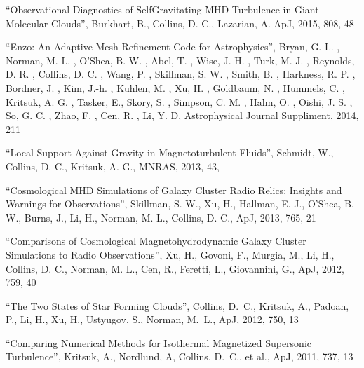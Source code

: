 \medskip
\noindent
``Observational Diagnostics of Self­Gravitating MHD Turbulence in Giant Molecular Clouds'', 
Burkhart, B., Collins, D.  C., Lazarian, A.
ApJ,  2015, 808, 48

\medskip
\noindent
``Enzo: An Adaptive Mesh Refinement Code for Astrophysics'', 
Bryan, G. L. , Norman, M. L. , O'Shea, B. W. , Abel, T. , Wise, J. H. , Turk, M. J. , Reynolds, D. R. , Collins, D. C. , Wang, P. , Skillman, S. W. , Smith, B. , Harkness, R. P. , Bordner, J. , Kim, J.-h. , Kuhlen, M. , Xu, H. , Goldbaum, N. , Hummels, C. , Kritsuk, A. G. , Tasker, E., Skory, S. , Simpson, C. M. , Hahn, O. , Oishi, J. S. , So, G. C. , Zhao, F. , Cen, R. , Li, Y. D,
Astrophysical Journal Suppliment, 2014, 211

\medskip
\noindent
``Local Support Against Gravity in Magnetoturbulent Fluids'',
Schmidt, W., Collins, D. C., Kritsuk, A. G.,
MNRAS, 2013, 43, 


\medskip
\noindent
``Cosmological MHD Simulations of Galaxy Cluster Radio Relics: Insights and Warnings for Observations'', 
Skillman, S. W., Xu, H., Hallman, E. J., O’Shea, B. W., Burns, J., Li, H., Norman, M. L., Collins, D. C.,
ApJ, 2013, 765, 21

\medskip
\noindent
``Comparisons of Cosmological Magnetohydrodynamic Galaxy Cluster Simulations to Radio Observations'', 
Xu, H., Govoni, F., Murgia, M., Li, H., Collins, D. C., Norman, M. L., Cen, R., Feretti, L., Giovannini, G.,
ApJ, 2012, 759, 40

\medskip
\noindent
``The Two States of Star Forming Clouds'', 
Collins, D.~C., Kritsuk, A., Padoan, P., Li, H., Xu, H., Ustyugov, S., Norman, M.~L.,
ApJ, 2012, 750, 13


\medskip
\noindent
``Comparing Numerical Methods for Isothermal Magnetized Supersonic Turbulence'', 
Kritsuk, A., Nordlund, A, Collins, D.~C., et al.,
ApJ, 2011, 737, 13

